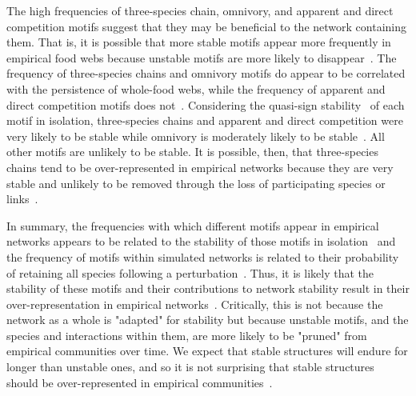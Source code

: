 \documentclass[12pt]{article}
\begin{document}
	The high frequencies of three-species chain, omnivory, and apparent and direct competition motifs suggest that they may be beneficial to the network containing them. That is, it is possible that more stable motifs appear more frequently in empirical food webs because unstable motifs are more likely to disappear~\citep{Borrelli2015,Borrelli2015a}. The frequency of three-species chains and omnivory motifs do appear to be correlated with the persistence of whole-food webs, while the frequency of apparent and direct competition motifs does not~\citep{Stouffer2010}. Considering the quasi-sign stability~\citep{Allesina2008} of each motif in isolation, three-species chains and apparent and direct competition were very likely to be stable while omnivory is moderately likely to be stable~\citep{Borrelli2015a}. All other motifs are unlikely to be stable. It is possible, then, that three-species chains tend to be over-represented in empirical networks because they are very stable and unlikely to be removed through the loss of participating species or links~\citep{Borrelli2015}. 



	In summary, the frequencies with which different motifs appear in empirical networks appears to be related to the stability of those motifs in isolation~\citep{Stouffer2010b,Borrelli2015a} and the frequency of motifs within simulated networks is related to their probability of retaining all species following a perturbation~\citep{Stouffer2010b}. Thus, it is likely that the stability of these motifs and their contributions to network stability result in their over-representation in empirical networks~\citep{Borrelli2015}. Critically, this is not because the network as a whole is "adapted" for stability but because unstable motifs, and the species and interactions within them, are more likely to be "pruned" from empirical communities over time. We expect that stable structures will endure for longer than unstable ones, and so it is not surprising that stable structures should be over-represented in empirical communities~\citep{Borrelli2015}.
\end{document}
